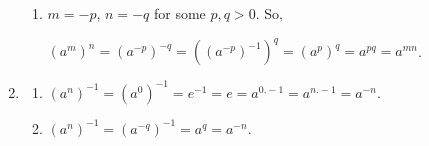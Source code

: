 \documentclass{article}
\begin{document}
\begin{enumerate}
\begin{enumerate}
            \item $ m = -p $, $ n = -q $ for some $  p, q > 0 $. So,

            $ (a^m)^n = (a^{-p})^{-q} = ((a^{-p})^{-1})^{q} = (a^{p})^{q} = a^{pq} = a^{mn} $.
        \end{enumerate}

    \item
        \begin{enumerate}
            \item $ (a^n)^{-1} = (a^0)^{-1} = e^{-1} = e = a^{0.-1} = a^{n.-1} = a^{-n}$.

            \item $ (a^n)^{-1} = (a^{-q})^{-1} = a^q = a^{-n}$.
        \end{enumerate}
\end{enumerate}
\end{document}

